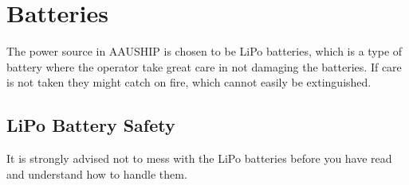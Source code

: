 \section{Batteries}
The power source in AAUSHIP is chosen to be LiPo batteries, which is
a type of battery where the operator take great care in not damaging
the batteries. If care is not taken they might catch on fire, which
cannot easily be extinguished.

\subsection{LiPo Battery Safety}
\begin{tcolorbox}[colback=yellow!75!,colframe=red]
It is strongly advised not to mess with the LiPo batteries before you
have read and understand how to handle them.
\end{tcolorbox}

